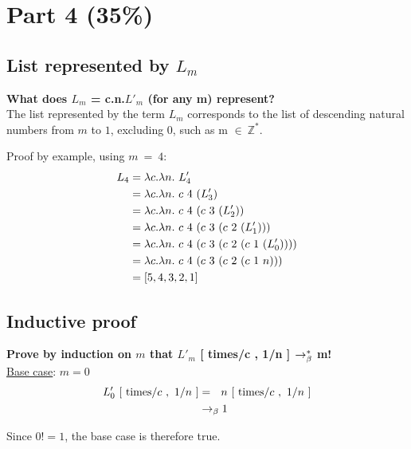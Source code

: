 \documentclass{article}
\begin{document}
	\section{Part 4 (35\%)}

	\begin{Large}
	
	\subsection{List represented by $L_m$}
	
		\textbf{What does $L_m$ = \lamb c.\lamb n.$L'_m$ (for any m) represent?}\\
		
		The list represented by the term $L_m$ corresponds to the list of descending natural numbers from $m$ to $1$, excluding 0, such as m $\in \ \mathbb{Z}^*$.
		\newline
		
		Proof by example, using $m \ = \ 4$:
		\begin{align*}
			L_4 &= \la c.\la n. \ L_4^\prime \\
			&= \la c.\la n. \ c \  4 \ ( L_3^\prime ) \\
			&= \la c.\la n. \ c \  4 \ ( c \ 3 \ (L_2^\prime )) \\
			&= \la c.\la n. \ c \  4 \ ( c \ 3 \ (c \ 2 \ (L_1^\prime ))) \\
			&= \la c.\la n. \ c \  4 \ ( c \ 3 \ (c \ 2 \ (c \ 1 \ (L_0^\prime )))) \\
			&= \la c.\la n. \ c \  4 \ ( c \ 3 \ (c \ 2 \ (c \ 1 \ n))) \\
			&= [5,4,3,2,1]
		\end{align*}
		\newline
		
	\subsection{Inductive proof}

		\textbf{Prove by induction on $m$ that $L'_m$ [ times/c , 1/n ] $\rightarrow_\beta^*$  m!}\\
		
		\underline{Base case}: $m=0$
		\begin{align*}
			L_0^\prime \ [\ \tim / c \ , \ 1/n \ ] &= \saq n \ [\ \tim / c \ , \ 1/n \ ] \\
			&\equals 1
		\end{align*}
		
		Since $0! = 1$, the base case is therefore true.
		\newline
		

\end{Large}
\end{document}
